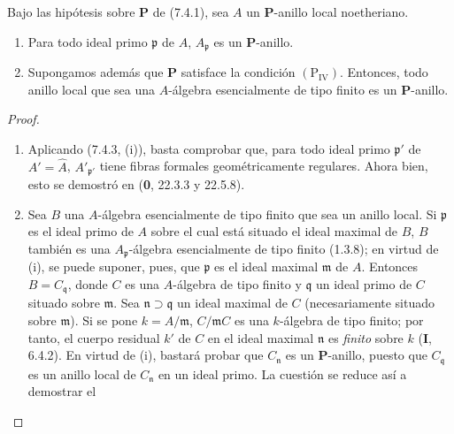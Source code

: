 \begin{theorem}[7.4.4]
\label{IV.2.s7.4.4-fr}
Bajo las hipótesis sobre $\boldsymbol P$ de \textup{(7.4.1)}, sea $A$ un
$\boldsymbol P$-anillo local noetheriano.
\begin{enumerate}
\item[\emph{(i)}] Para todo ideal primo $\mathfrak p$ de $A$,
$A_{\mathfrak p}$ es un $\boldsymbol P$-anillo.
\item[\emph{(ii)}] Supongamos además que $\boldsymbol P$ satisface
la condición $(\mathrm P_{\mathrm{IV}})$. Entonces, todo anillo
local que sea una $A$-álgebra esencialmente de tipo finito es un
$\boldsymbol P$-anillo.
\end{enumerate}
\end{theorem}

\begin{proof}
\begin{enumerate}
\item[(i)] Aplicando (7.4.3, (i)), basta comprobar que,
para todo ideal primo $\mathfrak p'$ de $A'=\widehat A$,
$A'_{\mathfrak p'}$ tiene fibras formales geométricamente
regulares. Ahora bien, esto se demostró en (\textbf 0, 22.3.3 y 22.5.8).


\item[(ii)] Sea $B$ una $A$-álgebra esencialmente de tipo
finito que sea un anillo local. Si $\mathfrak p$ es el ideal primo
de $A$ sobre el cual está situado el ideal maximal de $B$, $B$
también es una $A_{\mathfrak p}$-álgebra esencialmente de tipo
finito (1.3.8); en virtud de (i), se puede suponer, pues, que
$\mathfrak p$ es el ideal maximal $\mathfrak m$ de $A$. Entonces
$B=C_{\mathfrak q}$, donde $C$ es una $A$-álgebra de tipo finito y
$\mathfrak q$ un ideal primo de $C$ situado sobre $\mathfrak m$.
Sea $\mathfrak n\supset\mathfrak q$ un ideal maximal de $C$
(necesariamente situado sobre $\mathfrak m$). Si se pone
$k=A/\mathfrak m$, $C/\mathfrak mC$ es una $k$-álgebra de tipo
finito; por tanto, el cuerpo residual $k'$ de $C$ en el ideal
maximal $\mathfrak n$ es \emph{finito} sobre $k$ (\textbf I, 6.4.2). En virtud
de (i), bastará probar que $C_{\mathfrak n}$ es un
$\boldsymbol P$-anillo, puesto que $C_{\mathfrak q}$ es un anillo
local de $C_{\mathfrak n}$ en un ideal primo. La cuestión se reduce así
a demostrar el
\end{enumerate}
\end{proof}
